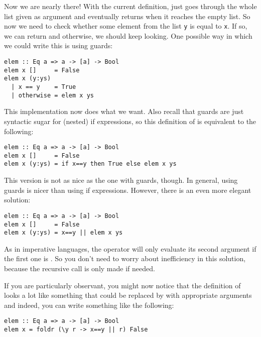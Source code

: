 Now we are nearly there! With the current definition,  just goes through the whole list given as argument and eventually returns  when it reaches the empty list. So now we need to check whether some element from the list \texttt{\small y} is equal to \texttt{\small x}. If so, we can return  and otherwise, we should keep looking. One possible way in which we could write this is using guards:
\begin{verbatim}
elem :: Eq a => a -> [a] -> Bool
elem x []     = False
elem x (y:ys)
  | x == y    = True 
  | otherwise = elem x ys
\end{verbatim}
This implementation now does what we want. Also recall that guards are just syntactic sugar for (nested) if expressions, so this definition of  is equivalent to the following:
\begin{verbatim}
elem :: Eq a => a -> [a] -> Bool
elem x []     = False
elem x (y:ys) = if x==y then True else elem x ys
\end{verbatim}
This version is not as nice as the one with guards, though. In general, using guards is nicer than using if expressions. However, there is an even more elegant solution:
\begin{verbatim}
elem :: Eq a => a -> [a] -> Bool
elem x []     = False
elem x (y:ys) = x==y || elem x ys
\end{verbatim}
As in imperative languages, the \haskellIn{(||)} operator will only evaluate its second argument if the first one is . So you don't need to worry about inefficiency in this solution, because the recursive call is only made if needed. 

If you are particularly observant, you might now notice that the definition of  looks a lot like something that could be replaced by  with appropriate arguments and indeed, you can write something like the following:
\begin{verbatim}
elem :: Eq a => a -> [a] -> Bool
elem x = foldr (\y r -> x==y || r) False
\end{verbatim}

